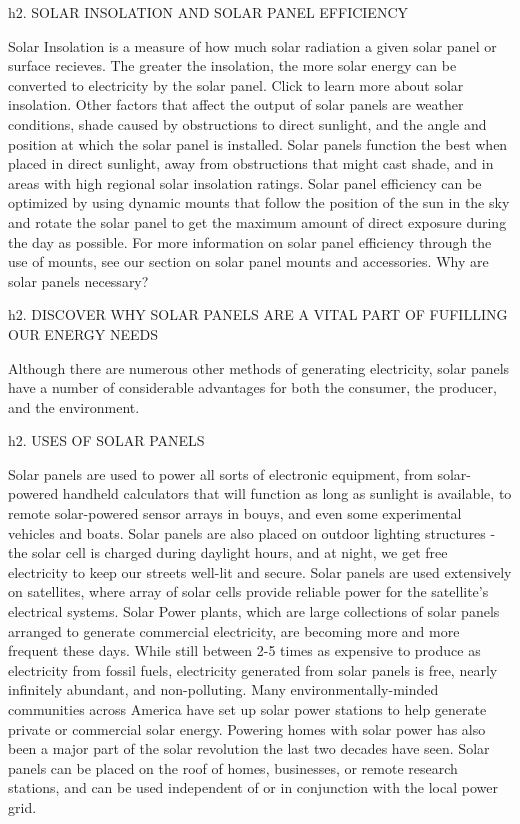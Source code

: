h2. SOLAR INSOLATION AND SOLAR PANEL EFFICIENCY

Solar Insolation is a measure of how much solar radiation a given solar panel or surface recieves. The greater the insolation, the more solar energy can be converted to electricity by the solar panel. Click to learn more about solar insolation. 
Other factors that affect the output of solar panels are weather conditions, shade caused by obstructions to direct sunlight, and the angle and position at which the solar panel is installed. Solar panels function the best when placed in direct sunlight, away from obstructions that might cast shade, and in areas with high regional solar insolation ratings. 
Solar panel efficiency can be optimized by using dynamic mounts that follow the position of the sun in the sky and rotate the solar panel to get the maximum amount of direct exposure during the day as possible. For more information on solar panel efficiency through the use of mounts, see our section on solar panel mounts and accessories.
Why are solar panels necessary?

h2. DISCOVER WHY SOLAR PANELS ARE A VITAL PART OF FUFILLING OUR ENERGY NEEDS

Although there are numerous other methods of generating electricity, solar panels have a number of considerable advantages for both the consumer, the producer, and the environment. 

h2. USES OF SOLAR PANELS

Solar panels are used to power all sorts of electronic equipment, from solar-powered handheld calculators that will function as long as sunlight is available, to remote solar-powered sensor arrays in bouys, and even some experimental vehicles and boats. Solar panels are also placed on outdoor lighting structures - the solar cell is charged during daylight hours, and at night, we get free electricity to keep our streets well-lit and secure. Solar panels are used extensively on satellites, where array of solar cells provide reliable power for the satellite's electrical systems.
Solar Power plants, which are large collections of solar panels arranged to generate commercial electricity, are becoming more and more frequent these days. While still between 2-5 times as expensive to produce as electricity from fossil fuels, electricity generated from solar panels is free, nearly infinitely abundant, and non-polluting. Many environmentally-minded communities across America have set up solar power stations to help generate private or commercial solar energy. 
Powering homes with solar power has also been a major part of the solar revolution the last two decades have seen. Solar panels can be placed on the roof of homes, businesses, or remote research stations, and can be used independent of or in conjunction with the local power grid. 

